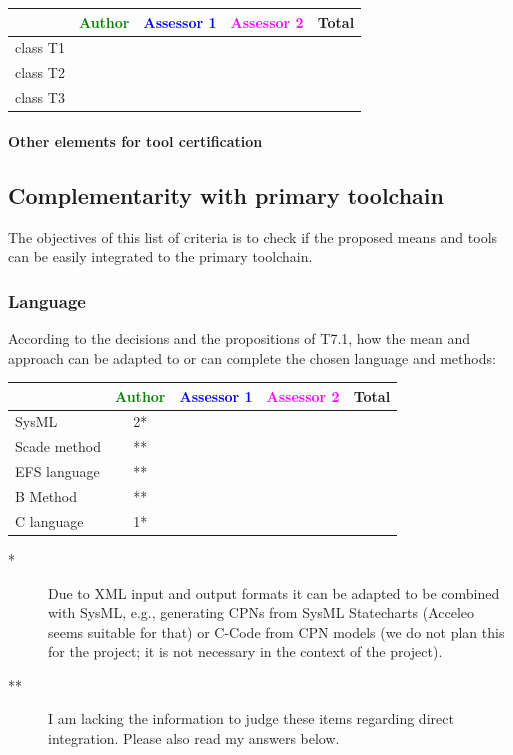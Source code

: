 \begin{tabular}{|l | c | c | c | c|}
\hline
& \textcolor{green}{Author} & \textcolor{blue}{Assessor 1} & \textcolor{magenta}{Assessor 2} & Total \\
\hline 
class T1 & & & &  \\
\hline
class T2   & & & & \\
\hline
class T3  & & & & \\
\hline
\end{tabular}



\paragraph{Other elements for tool certification}


\subsection{Complementarity with primary toolchain}

The objectives of this list of criteria is to check if the proposed means and tools can be easily integrated to the primary toolchain.

\subsubsection{Language}


According to the decisions and the propositions of T7.1, how the mean and approach can be adapted to or can complete the chosen language and methods:

\begin{tabular}{|l | c | c | c | c|}
\hline
& \textcolor{green}{Author} & \textcolor{blue}{Assessor 1} & \textcolor{magenta}{Assessor 2} & Total \\
\hline 
SysML  &2*& & & \\
\hline
Scade method &** & & & \\
\hline
EFS language &** & & & \\
\hline
B Method &** & & & \\
\hline
C language &1* & & & \\
\hline
\end{tabular}

\begin{author_comment}
\begin{description}
\item[*] Due to XML input and output formats it can be adapted to be combined with SysML, e.g., generating CPNs from SysML Statecharts (Acceleo seems suitable for that) or C-Code from CPN models (we do not plan this for the project; it is not necessary in the context of the project).
\item[**] I am lacking the information to judge these items regarding direct integration. Please also read my answers below.
\end{description}
\end{author_comment}


